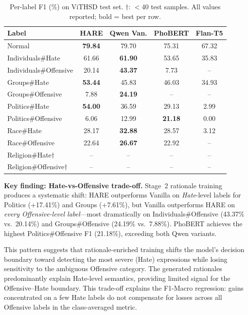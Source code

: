 \documentclass[conference]{IEEEtran}
\begin{document}
\begin{table}[ht]
\centering
\caption{Per-label F1 (\%) on ViTHSD test set. $\dagger$: $<$40 test samples.
All values reported; bold = best per row.}
\label{tab:label_f1}
\scriptsize
\setlength{\tabcolsep}{2pt}
\begin{tabular}{lcccc}
\toprule
\textbf{Label} & \textbf{HARE} & \textbf{Qwen Van.} & \textbf{PhoBERT} & \textbf{Flan-T5} \\
\midrule
Normal                  & \textbf{79.84} & 79.70 & 75.31 & 67.32 \\
Individuals\#Hate       & 61.66 & \textbf{61.90} & 53.65 & 35.83 \\
Individuals\#Offensive  & 20.14 & \textbf{43.37} & 7.73 & -- \\
Groups\#Hate            & \textbf{53.44} & 45.83 & 46.03 & 34.93 \\
Groups\#Offensive       & 7.88  & \textbf{24.19} & -- & -- \\
Politics\#Hate          & \textbf{54.00} & 36.59 & 29.13 & 2.99  \\
Politics\#Offensive     & 6.06  & 12.99 & \textbf{21.18} & 0.00 \\
Race\#Hate              & 28.17 & \textbf{32.88} & 28.57 & 3.12  \\
Race\#Offensive         & 22.64 & \textbf{26.67} & 22.92 & -- \\
Religion\#Hate$\dagger$          & --  & -- & -- & -- \\
Religion\#Offensive$\dagger$     & --  & -- & -- & -- \\
\bottomrule
\end{tabular}
\end{table}

\textbf{Key finding: Hate-vs-Offensive trade-off.} Stage~2 rationale training
produces a systematic shift: HARE outperforms Vanilla on \textit{Hate}-level
labels for Politics (+17.41\%) and Groups (+7.61\%), but Vanilla outperforms HARE
on \textit{every Offensive-level label}---most dramatically on
Individuals\#Offensive (43.37\% vs.\ 20.14\%) and Groups\#Offensive (24.19\% vs.\
7.88\%). PhoBERT achieves the highest Politics\#Offensive F1 (21.18\%), exceeding
both Qwen variants.

This pattern suggests that rationale-enriched training shifts the model's
decision boundary toward detecting the most severe (Hate) expressions while
losing sensitivity to the ambiguous Offensive category. The generated rationales
predominantly explain Hate-level semantics, providing limited signal for the
Offensive--Hate boundary. This trade-off explains the F1-Macro regression: gains
concentrated on a few Hate labels do not compensate for losses across all
Offensive labels in the class-averaged metric.
\end{document}
